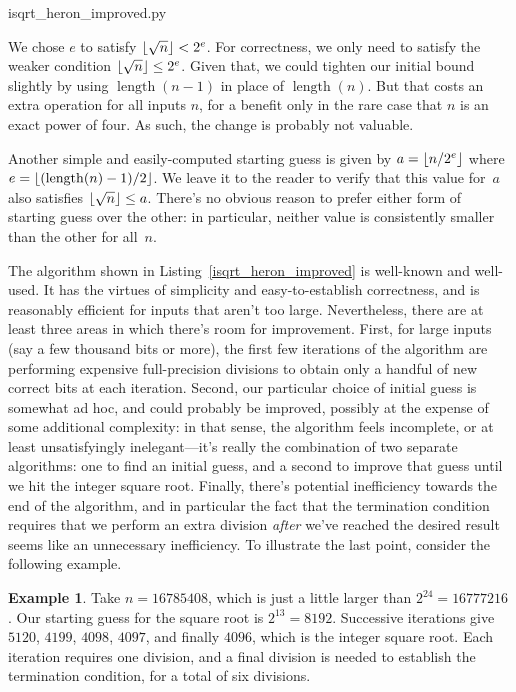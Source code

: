 \documentclass[a4paper]{article}
\DeclarePairedDelimiter\floor{\lfloor}{\rfloor}
\DeclareMathOperator{\length}{length}
\theoremstyle{plain}
\theoremstyle{definition}
\newtheorem{example}[theorem]{Example}
\begin{document}

  {isqrt_heron_improved.py}

We chose $e$ to satisfy $\floor{\sqrt n} < 2^e$. For correctness, we only need
to satisfy the weaker condition $\floor{\sqrt n} \le 2^e$. Given that, we could
tighten our initial bound slightly by using $\length(n-1)$ in place of
$\length(n)$. But that costs an extra operation for all inputs $n$, for a
benefit only in the rare case that $n$ is an exact power of four. As such, the
change is probably not valuable.

Another simple and easily-computed starting guess is given by $a = \floor{n /
2^e}$ where $e =\floor{(\length(n) - 1) / 2}$. We leave it to the reader to
verify that this value for~$a$ also satisfies $\floor{\sqrt n} \le a$. There's
no obvious reason to prefer either form of starting guess over the other: in
particular, neither value is consistently smaller than the other for all~$n$.

The algorithm shown in Listing~\ref{isqrt_heron_improved} is well-known and
well-used. It has the virtues of simplicity and easy-to-establish correctness,
and is reasonably efficient for inputs that aren't too large. Nevertheless,
there are at least three areas in which there's room for improvement. First,
for large inputs (say a few thousand bits or more), the first few iterations of
the algorithm are performing expensive full-precision divisions to obtain only
a handful of new correct bits at each iteration. Second, our particular choice
of initial guess is somewhat ad hoc, and could probably be improved, possibly
at the expense of some additional complexity: in that sense, the algorithm
feels incomplete, or at least unsatisfyingly inelegant---it's really the
combination of two separate algorithms: one to find an initial guess, and a
second to improve that guess until we hit the integer square root. Finally,
there's potential inefficiency towards the end of the algorithm, and in
particular the fact that the termination condition requires that we perform an
extra division \emph{after} we've reached the desired result seems like an
unnecessary inefficiency. To illustrate the last point, consider the following
example.

\begin{example}
  Take $n = 16785408$, which is just a little larger than $2^{24} = 16777216$.
  Our starting guess for the square root is $2^{13} = 8192$. Successive
  iterations give $5120$, $4199$, $4098$, $4097$, and finally $4096$, which
  is the integer square root. Each iteration requires one division, and
  a final division is needed to establish the termination condition, for
  a total of six divisions.
\end{example}
\end{document}
